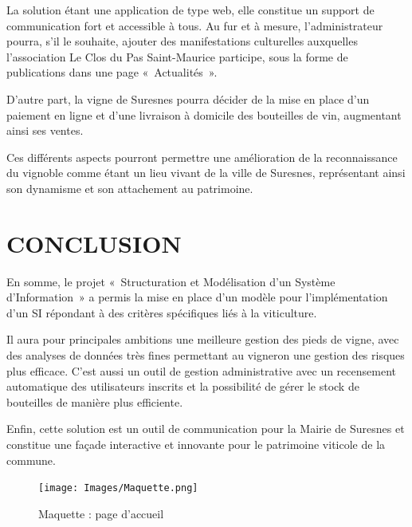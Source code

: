 \documentclass[a4paper, titlepage]{report}
\begin{document}
La solution étant une application de type web, elle constitue un support
de communication fort et accessible à tous. Au fur et à mesure,
l'administrateur pourra, s'il le souhaite, ajouter des manifestations
culturelles auxquelles l'association Le Clos du Pas Saint-Maurice
participe, sous la forme de publications dans une page «~Actualités~».

D'autre part, la vigne de Suresnes pourra décider de la mise en place
d'un paiement en ligne et d'une livraison à domicile des bouteilles de
vin, augmentant ainsi ses ventes.

Ces différents aspects pourront permettre une amélioration de la
reconnaissance du vignoble comme étant un lieu vivant de la ville de
Suresnes, représentant ainsi son dynamisme et son attachement au
patrimoine.


\chapter{CONCLUSION}

En somme, le projet «~Structuration et Modélisation d'un Système
d'Information~» a permis la mise en place d'un modèle pour
l'implémentation d'un SI répondant à des critères spécifiques liés à la
viticulture.

Il aura pour principales ambitions une meilleure gestion des pieds de
vigne, avec des analyses de données très fines permettant au vigneron
une gestion des risques plus efficace. C'est aussi un outil de gestion
administrative avec un recensement automatique des utilisateurs inscrits
et la possibilité de gérer le stock de bouteilles de manière plus
efficiente.

Enfin, cette solution est un outil de communication pour la Mairie de
Suresnes et constitue une façade interactive et innovante pour le
patrimoine viticole de la commune.

\clearpage
\begin{figure}[!ht]
\centering
\texttt{[image: Images/Maquette.png]}
\caption{Maquette : page d'accueil}
\end{figure}
\end{document}
